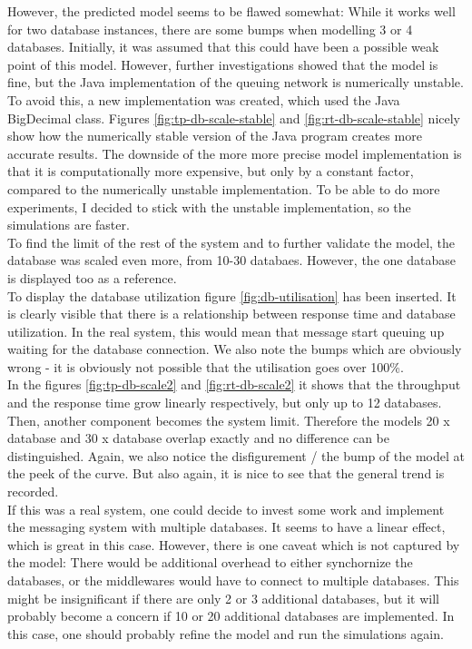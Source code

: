 \documentclass[a4paper]{article}
\begin{document}
However, the predicted model seems to be flawed somewhat: While it works well for two database instances, there are some bumps when modelling 3 or 4 databases. Initially, it was assumed that this could have been a possible weak point of this model. However, further investigations showed that the model is fine, but the Java implementation of the queuing network is numerically unstable. To avoid this, a new implementation was created, which used the Java BigDecimal class. Figures \ref{fig:tp-db-scale-stable} and \ref{fig:rt-db-scale-stable} nicely show how the numerically stable version of the Java program creates more accurate results. The downside of the more more precise model implementation is that it is computationally more expensive, but only by a constant factor, compared to the numerically unstable implementation. To be able to do more experiments, I decided to stick with the unstable implementation, so the simulations are faster.\\

To find the limit of the rest of the system and to further validate the model, the database was scaled even more, from 10-30 databaes. However, the one database is displayed too as a reference.\\

To display the database utilization figure \ref{fig:db-utilisation} has been inserted. It is clearly visible that there is a relationship between response time and database utilization. In the real system, this would mean that message start queuing up waiting for the database connection. We also note the bumps which are obviously wrong - it is obviously not possible that the utilisation goes over 100\%.\\

In the figures \ref{fig:tp-db-scale2} and \ref{fig:rt-db-scale2} it shows that the throughput and the response time grow linearly respectively, but only up to 12 databases. Then, another component becomes the system limit. Therefore the models 20 x database and 30 x database overlap exactly and no difference can be distinguished. Again, we also notice the disfigurement / the bump of the model at the peek of the curve. But also again, it is nice to see that the general trend is recorded.\\

If this was a real system, one could decide to invest some work and implement the messaging system with multiple databases. It seems to have a linear effect, which is great in this case. However, there is one caveat which is not captured by the model: There would be additional overhead to either synchornize the databases, or the middlewares would have to connect to multiple databases. This might be insignificant if there are only 2 or 3 additional databases, but it will probably become a concern if 10 or 20 additional databases are implemented. In this case, one should probably refine the model and run the simulations again.\\
\end{document}
